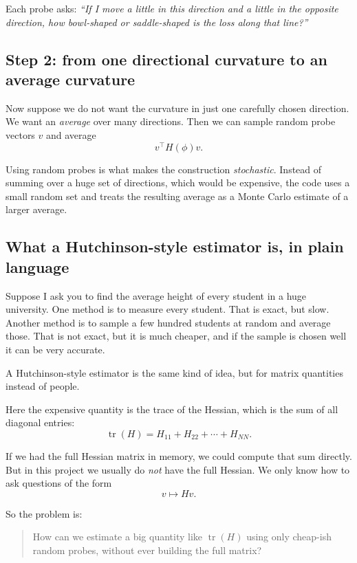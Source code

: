 \documentclass[11pt,letterpaper]{article}
\newcommand{\tr}{\operatorname{tr}}
\begin{document}
\begin{keyidea}
Each probe asks:
\emph{``If I move a little in this direction and a little in the opposite
direction, how bowl-shaped or saddle-shaped is the loss along that line?''}
\end{keyidea}

\subsection{Step 2: from one directional curvature to an average curvature}

Now suppose we do not want the curvature in just one carefully chosen
direction. We want an \emph{average} over many directions. Then we can sample
random probe vectors $v$ and average
\[
v^\top H(\phi) v.
\]

Using random probes is what makes the construction \emph{stochastic}. Instead
of summing over a huge set of directions, which would be expensive, the code
uses a small random set and treats the resulting average as a Monte Carlo
estimate of a larger average.

\subsection{What a Hutchinson-style estimator is, in plain language}

Suppose I ask you to find the average height of every student in a huge
university. One method is to measure every student. That is exact, but slow.
Another method is to sample a few hundred students at random and average those.
That is not exact, but it is much cheaper, and if the sample is chosen well it
can be very accurate.

A Hutchinson-style estimator is the same kind of idea, but for matrix
quantities instead of people.

Here the expensive quantity is the trace of the Hessian, which is the sum of
all diagonal entries:
\[
\tr(H) = H_{11} + H_{22} + \cdots + H_{NN}.
\]

If we had the full Hessian matrix in memory, we could compute that sum
directly. But in this project we usually do \emph{not} have the full Hessian.
We only know how to ask questions of the form
\[
v \mapsto Hv.
\]

So the problem is:
\begin{quote}
How can we estimate a big quantity like $\tr(H)$ using only cheap-ish random
probes, without ever building the full matrix?
\end{quote}
\end{document}
